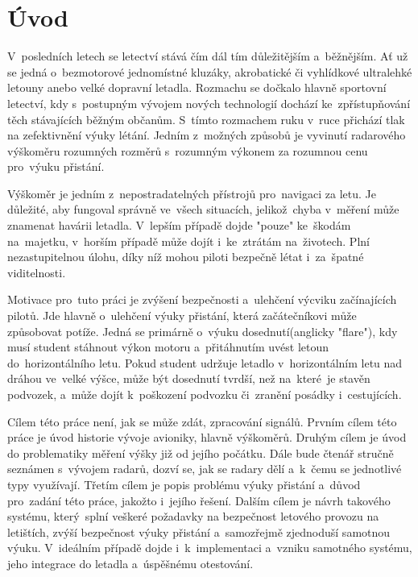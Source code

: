 
\newtheorem{definice}{Definice}

\chapter{Úvod}\label{uvod}
	V~posledních letech se letectví stává čím dál tím důležitějším a~běžnějším. Ať už se jedná o~bezmotorové jednomístné kluzáky, akrobatické či vyhlídkové ultralehké letouny anebo velké dopravní letadla. Rozmachu se dočkalo hlavně sportovní letectví, kdy s~postupným vývojem nových technologií dochází ke~zpřístupňování těch stávajících běžným občanům. S~tímto rozmachem ruku v~ruce přichází tlak na zefektivnění výuky létání. Jedním z~možných způsobů je vyvinutí radarového výškoměru rozumných rozměrů s~rozumným výkonem za rozumnou cenu pro~výuku přistání.

	Výškoměr je jedním z~nepostradatelných přístrojů pro~navigaci za letu. Je důležité, aby fungoval správně ve~všech situacích, jelikož~chyba v~měření může znamenat havárii letadla. V~lepším případě dojde "pouze" ke~škodám na~majetku, v~horším případě může dojít i~ke~ztrátám na~životech. Plní nezastupitelnou úlohu, díky níž mohou piloti bezpečně létat i~za~špatné viditelnosti.\par
	
	Motivace pro~tuto práci je zvýšení bezpečnosti a~ulehčení výcviku začínajících pilotů. Jde hlavně o~ulehčení výuky přistání, která začátečníkovi může způsobovat potíže. Jedná se primárně o~výuku dosednutí(anglicky "flare"), kdy musí student stáhnout výkon motoru a~přitáhnutím uvést letoun do~horizontálního letu. Pokud student udržuje letadlo v~horizontálním letu nad dráhou ve~velké výšce, může být dosednutí tvrdší, než na~které~je stavěn podvozek, a~může dojít k~poškození podvozku či~zranění posádky i~cestujících.\par
		
	Cílem této práce není, jak se může zdát, zpracování signálů. Prvním cílem této práce je úvod historie vývoje avioniky, hlavně výškoměrů. Druhým cílem je úvod do problematiky měření výšky již od jejího počátku. Dále bude čtenář stručně seznámen s~vývojem radarů, dozví se, jak se radary dělí a~k~čemu se jednotlivé typy využívají.
	Třetím cílem je popis problému výuky přistání a~důvod pro~zadání této práce, jakožto i~jejího řešení. Dalším cílem je návrh takového systému, který~splní veškeré požadavky na bezpečnost letového provozu na letištích, zvýší bezpečnost výuky přistání a~samozřejmě zjednoduší samotnou výuku. V~ideálním případě dojde i~k~implementaci a~vzniku samotného systému, jeho integrace do letadla a~úspěšnému otestování.\par

